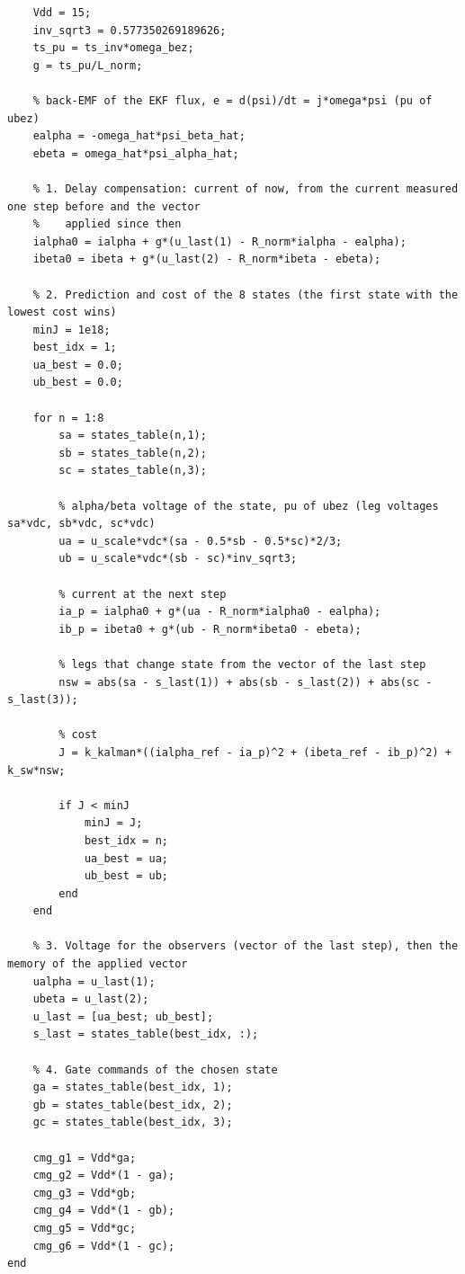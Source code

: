 \documentclass[11pt,a4paper]{scrartcl}
\begin{document}
\begin{onehalfspace}
\begin{singlespace}
\begin{verbatim}
    Vdd = 15;
    inv_sqrt3 = 0.577350269189626;
    ts_pu = ts_inv*omega_bez;
    g = ts_pu/L_norm;

    % back-EMF of the EKF flux, e = d(psi)/dt = j*omega*psi (pu of ubez)
    ealpha = -omega_hat*psi_beta_hat;
    ebeta = omega_hat*psi_alpha_hat;

    % 1. Delay compensation: current of now, from the current measured one step before and the vector
    %    applied since then
    ialpha0 = ialpha + g*(u_last(1) - R_norm*ialpha - ealpha);
    ibeta0 = ibeta + g*(u_last(2) - R_norm*ibeta - ebeta);

    % 2. Prediction and cost of the 8 states (the first state with the lowest cost wins)
    minJ = 1e18;
    best_idx = 1;
    ua_best = 0.0;
    ub_best = 0.0;

    for n = 1:8
        sa = states_table(n,1);
        sb = states_table(n,2);
        sc = states_table(n,3);

        % alpha/beta voltage of the state, pu of ubez (leg voltages sa*vdc, sb*vdc, sc*vdc)
        ua = u_scale*vdc*(sa - 0.5*sb - 0.5*sc)*2/3;
        ub = u_scale*vdc*(sb - sc)*inv_sqrt3;

        % current at the next step
        ia_p = ialpha0 + g*(ua - R_norm*ialpha0 - ealpha);
        ib_p = ibeta0 + g*(ub - R_norm*ibeta0 - ebeta);

        % legs that change state from the vector of the last step
        nsw = abs(sa - s_last(1)) + abs(sb - s_last(2)) + abs(sc - s_last(3));

        % cost
        J = k_kalman*((ialpha_ref - ia_p)^2 + (ibeta_ref - ib_p)^2) + k_sw*nsw;

        if J < minJ
            minJ = J;
            best_idx = n;
            ua_best = ua;
            ub_best = ub;
        end
    end

    % 3. Voltage for the observers (vector of the last step), then the memory of the applied vector
    ualpha = u_last(1);
    ubeta = u_last(2);
    u_last = [ua_best; ub_best];
    s_last = states_table(best_idx, :);

    % 4. Gate commands of the chosen state
    ga = states_table(best_idx, 1);
    gb = states_table(best_idx, 2);
    gc = states_table(best_idx, 3);

    cmg_g1 = Vdd*ga;
    cmg_g2 = Vdd*(1 - ga);
    cmg_g3 = Vdd*gb;
    cmg_g4 = Vdd*(1 - gb);
    cmg_g5 = Vdd*gc;
    cmg_g6 = Vdd*(1 - gc);
end
\end{verbatim}
\end{singlespace}

\end{onehalfspace}
\end{document}
